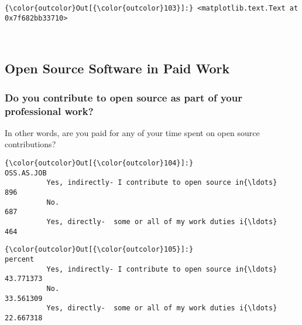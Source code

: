 \documentclass[11pt]{article}
\begin{document}
            \begin{Verbatim}[commandchars=\\\{\}]
{\color{outcolor}Out[{\color{outcolor}103}]:} <matplotlib.text.Text at 0x7f682bb33710>
\end{Verbatim}
        
    \begin{center}
    \end{center}
    { \hspace*{\fill} \\}
    
    \subsection{Open Source Software in Paid
Work}\label{open-source-software-in-paid-work}

    \subsubsection{Do you contribute to open source as part of your
professional
work?}\label{do-you-contribute-to-open-source-as-part-of-your-professional-work}

In other words, are you paid for any of your time spent on open source
contributions?



            \begin{Verbatim}[commandchars=\\\{\}]
{\color{outcolor}Out[{\color{outcolor}104}]:}                                                     OSS.AS.JOB
          Yes, indirectly- I contribute to open source in{\ldots}         896
          No.                                                        687
          Yes, directly-  some or all of my work duties i{\ldots}         464
\end{Verbatim}
        

            \begin{Verbatim}[commandchars=\\\{\}]
{\color{outcolor}Out[{\color{outcolor}105}]:}                                                       percent
          Yes, indirectly- I contribute to open source in{\ldots}  43.771373
          No.                                                 33.561309
          Yes, directly-  some or all of my work duties i{\ldots}  22.667318
\end{Verbatim}
        
\end{document}
